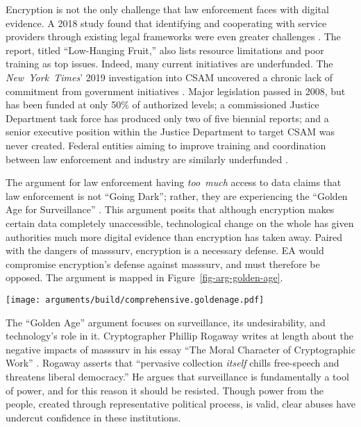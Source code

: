 \documentclass{IEEEtran}
\def\ii#1{\mbox{\textit{#1}}}
\newcommand{\myfig}[1]{Figure~\ref{#1}}
\begin{document}

Encryption is not the only challenge that law enforcement faces with digital evidence. A 2018 study found that
identifying and cooperating with service providers through existing legal frameworks were even greater challenges
\cite{carter_2018}. The report, titled ``Low-Hanging Fruit,'' also lists resource limitations and poor training as top
issues. Indeed, many current initiatives are underfunded. The \ii{New York Times}' 2019 investigation into \ac{CSAM}
uncovered a chronic lack of commitment from government initiatives \cite{keller_internet_2019}. Major legislation passed
in 2008, but has been funded at only 50\% of authorized levels; a commissioned Justice Department task force has
produced only two of five biennial reports; and a senior executive position within the Justice Department to target
\ac{CSAM} was never created. Federal entities aiming to improve training and coordination between law enforcement and
industry are similarly underfunded \cite{carter_2018}.


The argument for law enforcement having \ii{too much} access to data claims that law enforcement is not ``Going Dark'';
rather, they are experiencing the ``Golden Age for Surveillance'' \cite{swire_encryption_2011}. This argument posits
that although encryption makes certain data completely unaccessible, technological change on the whole has given
authorities much more digital evidence than encryption has taken away. Paired with the dangers of \ac{masssurv},
encryption is a necessary defense. \Ac{EA} would compromise encryption's defense against \ac{masssurv}, and must
therefore be opposed. The argument is mapped in \myfig{fig-arg-golden-age}.

\begin{figure*}[p!]
  \centering
  \texttt{[image: arguments/build/comprehensive.goldenage.pdf]}
  \caption{A ``Golden Age for Surveillance'' Argument Map}
  \label{fig-arg-golden-age}
\end{figure*}

The ``Golden Age'' argument focuses on surveillance, its undesirability, and technology's role in it. Cryptographer
Phillip Rogaway writes at length about the negative impacts of \ac{masssurv} in his essay ``The Moral Character of
Cryptographic Work'' \cite{rogaway_moral_2015}. Rogaway asserts that ``pervasive collection \ii{itself} chills
free-speech and threatens liberal democracy.'' He argues that surveillance is fundamentally a tool of power, and for
this reason it should be resisted. Though power from the people, created through representative political process, is
valid, clear abuses have undercut confidence in these institutions.
\end{document}
